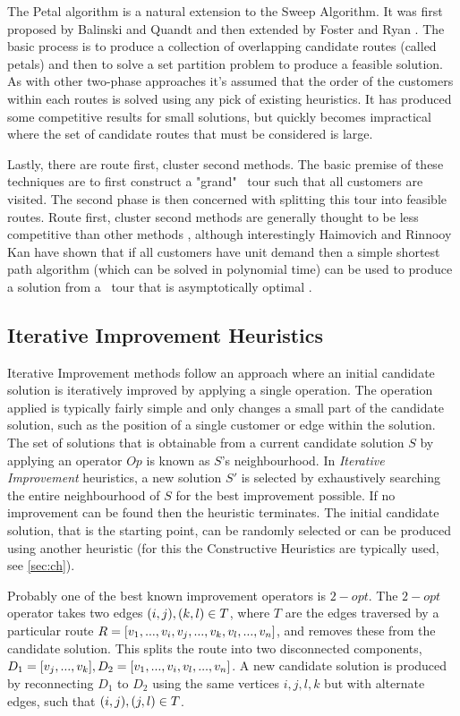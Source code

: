 The Petal algorithm is a natural extension to the Sweep Algorithm. It was first proposed by Balinski and Quandt \cite{??} and then extended by Foster and Ryan \cite{??}. The basic process is to produce a collection of overlapping candidate routes (called petals) and then to solve a set partition problem to produce a feasible solution. As with other two-phase approaches it's assumed that the order of the customers within each routes is solved using any pick of existing \TSP heuristics. It has produced some competitive results for small solutions, but quickly becomes impractical where the set of candidate routes that must be considered is large.  

Lastly, there are route first, cluster second methods. The basic premise of these techniques are to first construct a "grand" \TSP\ tour such that all customers are visited. The second phase is then concerned with splitting this tour into feasible routes. Route first, cluster second methods are generally thought to be less competitive than other methods \cite{Laporte:1999}, although interestingly Haimovich and Rinnooy Kan have shown that if all customers have unit demand then a simple shortest path algorithm (which can be solved in polynomial time) can be used to produce a solution from a \TSP\ tour that is asymptotically optimal \cite{HK:1985}.

\subsection{Iterative Improvement Heuristics}

Iterative Improvement methods follow an approach where an initial candidate solution is iteratively improved by applying a single operation. The operation applied is typically fairly simple and only changes a small part of the candidate solution, such as the position of a single customer or edge within the solution. The set of solutions that is obtainable from a current candidate solution $S$ by applying an operator $Op$ is known as $S$'s neighbourhood. In \emph{Iterative Improvement} heuristics, a new solution $S'$ is selected by exhaustively searching the entire neighbourhood of $S$ for the best improvement possible. If no improvement can be found then the heuristic terminates. The initial candidate solution, that is the starting point, can be randomly selected or can be produced using another heuristic (for this the Constructive Heuristics are typically used, see \ref{sec:ch}).
 
Probably one of the best known improvement operators is $2-opt$. The $2-opt$ operator takes two edges $(i,j), (k,l) \in T$, where $T$ are the edges traversed by a particular route $R = [v_1, ..., v_i, v_j, ..., v_k, v_l, ..., v_n]$, and removes these from the candidate solution. This splits the route into two disconnected components, $D_1 = [v_j, ..., v_k], D_2 = [v_1, ..., v_i,v_l, ..., v_n]$. A new candidate solution is produced by reconnecting $D_1$ to $D_2$ using the same vertices $i,j,l,k$ but with alternate edges, such that $(i,j), (j,l) \in T$.

